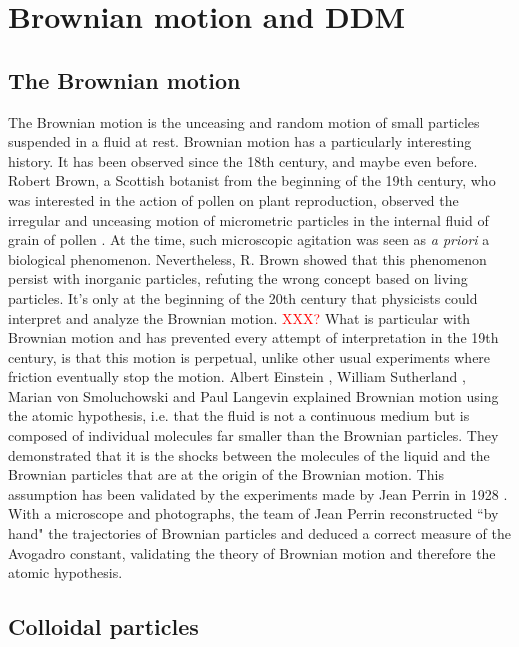 \documentclass[%
 aip,
 jmp,%
 amsmath,amssymb,
reprint,%
]{revtex4-1}
\begin{document}
\section{Brownian motion and DDM}
\label{sec:BrownSection}

\subsection{The Brownian motion}

The Brownian motion is the unceasing and random motion of small particles suspended in a fluid at rest. Brownian motion has a particularly interesting history. It has been observed since the 18th century, and maybe even before. Robert Brown, a Scottish botanist from the beginning of the 19th century, who was interested in the action of pollen on plant reproduction, observed the irregular and unceasing motion of micrometric particles in the internal fluid of grain of pollen \citep{13_brown1828brief}. At the time, such microscopic agitation was seen as \textit{a priori} a biological phenomenon. Nevertheless, R. Brown showed that this phenomenon persist with inorganic particles, refuting the wrong concept based on living particles. It's only at the beginning of the 20th century that physicists could interpret and analyze the Brownian motion. \textcolor{red}{XXX?} What is particular with Brownian motion and has prevented every attempt of interpretation in the 19th century, is that this motion is perpetual, unlike other usual experiments where friction eventually stop the motion. Albert Einstein \citep{9_einstein1906theory}, William Sutherland \citep{14_sutherland1905lxxv}, Marian von Smoluchowski \citep{10_von1906kinetischen} and Paul Langevin \citep{15_Langevin} explained Brownian motion using the atomic hypothesis, i.e. that the fluid is not a continuous medium but is composed of individual molecules far smaller than the Brownian particles. They demonstrated that it is the shocks between the molecules of the liquid and the Brownian particles that are at the origin of the Brownian motion. This assumption has been validated by the experiments made by Jean Perrin in 1928 \citep{22_perrin2014atomes}. With a microscope and photographs, the team of Jean Perrin reconstructed ``by hand" the trajectories of Brownian particles and deduced a correct measure of the Avogadro constant, validating the theory of Brownian motion and therefore the atomic hypothesis.

\subsection{Colloidal particles}
\end{document}
